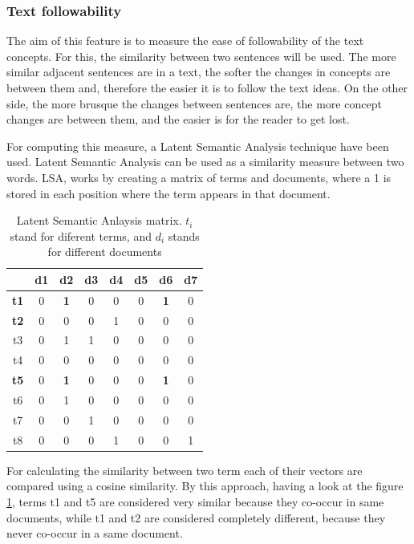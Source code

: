 \documentclass{acm_proc_article-sp}
\begin{document}
\subsubsection{Text followability}
The aim of this feature is to measure the ease of followability of the text concepts. For this, the similarity between two sentences will be used. The more similar adjacent sentences are in a text, the softer the changes in concepts are between them and, therefore the easier it is to follow the text ideas. On the other side, the more brusque the changes between sentences are, the more concept changes are between them, and the easier is for the reader to get lost.

For computing this measure, a Latent Semantic Analysis \cite{deerwester1990indexing} \cite{landauer2013handbook} technique have been used. Latent Semantic Analysis can be used as a similarity measure between two words. LSA, works by creating a matrix of terms and documents, where a 1 is stored in each position where the term appears in that document.

\begin{table}[hbt]
 \begin{center}
 \begin{tabular}{cccccccc}
     & d1 & d2 & d3 & d4 & d5 & d6 & d7 \\ \hline
 \bf t1 & 0  & \bf 1  & 0  & 0  & 0  & \bf 1  & 0  \\
 \bf t2 & 0  & 0  & 0  & 1  & 0  & 0  & 0  \\
  t3 & 0  & 1  & 1  & 0  & 0  & 0  & 0  \\
  t4 & 0  & 0  & 0  & 0  & 0  & 0  & 0  \\
  \bf t5 & 0  & \bf 1  & 0  & 0  & 0  & \bf 1  & 0  \\
  t6 & 0  & 1  & 0  & 0  & 0  & 0  & 0  \\
  t7 & 0  & 0  & 1  & 0  & 0  & 0  & 0  \\
  t8 & 0  & 0  & 0  & 1  & 0  & 0  & 1  \\
 
 \end{tabular}
 \end{center}
 \caption{Latent Semantic Anlaysis matrix. $t_{i}$ stand for diferent terms, and $d_{i}$ stands for different documents}
 \label{tab:lsamatrizea}
\end{table}

For calculating the similarity between two term each of their vectors are compared using a cosine similarity. By this approach, having a look at the figure \ref{tab:lsamatrizea}, terms t1 and t5 are considered very similar because they co-occur in same documents, while t1 and t2 are considered completely different, because they never co-occur in a same document.
\end{document}
